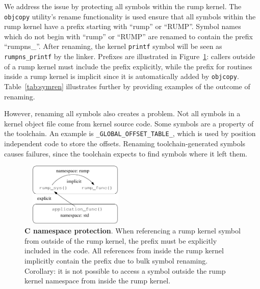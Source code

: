 We address the issue by protecting all symbols within the rump
kernel.  The \texttt{objcopy} utility's rename functionality is
used ensure that all symbols within the rump kernel have a prefix
starting with ``rump'' or ``RUMP''.  Symbol names which do not
begin with ``rump'' or ``RUMP''
are renamed to contain the prefix ``rumpns\_''.  After
renaming, the kernel \texttt{printf} symbol will be seen as
\texttt{rumpns\_printf} by the linker.  Prefixes are illustrated
in Figure~\ref{fig:namespace}: callers outside of a rump kernel
must include the prefix explicitly, while the prefix for routines
inside a rump kernel is implicit since it is automatically added
by \texttt{objcopy}.  Table~\ref{tab:symren} illustrates further
by providing examples of the outcome of renaming.

However, renaming all symbols also creates a problem.  Not all
symbols in a kernel object file come from kernel source code.
Some symbols are a property of the toolchain.  An example is
\verb+_GLOBAL_OFFSET_TABLE_+, which is used by position independent
code to store the offsets.  Renaming toolchain-generated symbols
causes failures, since the toolchain expects to find symbols where
it left them.

\begin{figure}[t]
\begin{center}
\includegraphics[width=5.3cm,height=3cm]{vpk_namespace.pdf}
\caption[C namespace protection]{\textbf{C namespace protection}.  When
referencing a rump kernel symbol from outside of the rump kernel, the
prefix must be explicitly included in the code.  All references from
inside the rump kernel implicitly contain the prefix due to bulk
symbol renaming.  Corollary: it is not possible to access a symbol
outside the rump kernel namespace from inside the rump kernel.}
\label{fig:namespace}
\end{center}
\end{figure}

